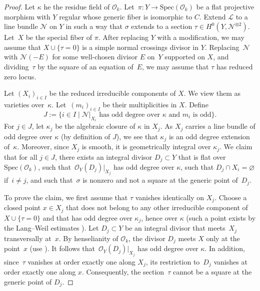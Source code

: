 \documentclass{amsart}
\theoremstyle{definition}
\theoremstyle{remark}
\numberwithin{equation}{section}
\newcommand{\Spec}{\mathrm{Spec}}
\def\cN{\mathcal{N}}
\def\cL{\mathcal{L}}
\def\cO{\mathcal{O}}
\begin{document}
\begin{proof}
Let $\kappa$ he the residue field of $\cO_k$.
Let~$\pi:Y\to \Spec(\cO_k)$ be a flat projective morphism with $Y$ regular whose generic fiber is isomorphic to $C$.
Extend $\cL$ to a line bundle $\cN$ on $Y$ in such a way that $\sigma$ extends to a section $\tau\in H^0(Y,\cN^{\otimes 2})$.
Let~$X$ be the special fiber of $\pi$. 
After replacing $Y$ with a modification, we may assume that $X\cup\{\tau=0\}$ is a simple normal crossings divisor in $Y$.
Replacing~$\cN$ with $\cN(-E)$ for some well-chosen divisor $E$ on~$Y$ supported on $X$, and dividing~$\tau$ by the square of an equation of~$E$, we may assume that $\tau$ has reduced zero locus.

Let $(X_i)_{i\in I}$ be the reduced irreducible components of $X$. We view them as varieties over~$\kappa$. Let~$(m_i)_{i\in I}$ be their multiplicities in $X$.
 Define 
 $$J:=\{i\in I\mid \cN|_{X_i}\textrm{ has odd degree over }\kappa\textrm{ and }m_i\textrm{ is odd}\}.$$ 
 For $j\in J$, let $\kappa_j$ be the algebraic closure of $\kappa$ in $X_j$.
 As $X_j$ carries a line bundle of odd degree over $\kappa$ (by definition of $J$), we see that $\kappa_j$ is an odd degree extension of~$\kappa$. Moreover, since $X_j$ is smooth, it is geometrically integral over $\kappa_j$. 
 We claim that for all $j\in J$, there exists an integral divisor $D_j\subset Y$ that is flat over~$\Spec(\cO_k)$, such that~$\cO_Y(D_j)|_{X_j}$ has odd degree over $\kappa$, 
 such that $D_j\cap X_i=\varnothing$ if~$i\neq j$, and such that~$\sigma$ is nonzero and not a square at the generic point of~$D_j$.

To prove the claim, we first assume that $\tau$ vanishes identically on $X_j$. 
Choose a closed point $x\in X_j$ that does not belong to any other irreducible component of~$X\cup\{\tau=0\}$ and that has odd degree over $\kappa_j$, hence over $\kappa$ (such a point exists by the Lang--Weil estimates \cite[Corollary~3]{LangWeil}).
Let $D_j\subset Y$ be an integral divisor that meets~$X_j$ transversally at~$x$. By henselianity of $\cO_k$, the divisor $D_j$ meets $X$ only at the point~$x$ (use \cite[Lemma~\href{https://stacks.math.columbia.edu/tag/04GH}{04GH}\,(1)]{SP}).
It follows that~$\cO_Y(D_j)|_{X_j}$ has odd degree over $\kappa$. In addition, since~$\tau$ vanishes at order exactly one along $X_j$, its restriction to~$D_j$ vanishes at order exactly one along $x$. Consequently, the section~$\tau$ cannot be a square at the generic point of $D_j$.


\end{proof}
\end{document}
